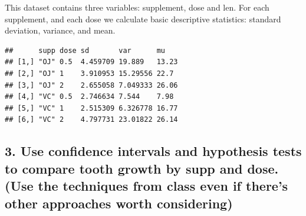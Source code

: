 \documentclass[]{article}
\newenvironment{Shaded}{\begin{snugshade}}{\end{snugshade}}
\newcommand{\CommentTok}[1]{\textcolor[rgb]{0.56,0.35,0.01}{\textit{#1}}}
\newcommand{\ControlFlowTok}[1]{\textcolor[rgb]{0.13,0.29,0.53}{\textbf{#1}}}
\newcommand{\DataTypeTok}[1]{\textcolor[rgb]{0.13,0.29,0.53}{#1}}
\newcommand{\KeywordTok}[1]{\textcolor[rgb]{0.13,0.29,0.53}{\textbf{#1}}}
\newcommand{\NormalTok}[1]{#1}
\newcommand{\OperatorTok}[1]{\textcolor[rgb]{0.81,0.36,0.00}{\textbf{#1}}}
\newcommand{\StringTok}[1]{\textcolor[rgb]{0.31,0.60,0.02}{#1}}
\begin{document}
This dataset contains three variables: supplement, dose and len. For
each supplement, and each dose we calculate basic descriptive
statistics: standard deviation, variance, and mean.

\begin{Shaded}
\end{Shaded}

\begin{verbatim}
##      supp dose sd       var      mu   
## [1,] "OJ" 0.5  4.459709 19.889   13.23
## [2,] "OJ" 1    3.910953 15.29556 22.7 
## [3,] "OJ" 2    2.655058 7.049333 26.06
## [4,] "VC" 0.5  2.746634 7.544    7.98 
## [5,] "VC" 1    2.515309 6.326778 16.77
## [6,] "VC" 2    4.797731 23.01822 26.14
\end{verbatim}

\hypertarget{use-confidence-intervals-and-hypothesis-tests-to-compare-tooth-growth-by-supp-and-dose.-use-the-techniques-from-class-even-if-theres-other-approaches-worth-considering}{%
\subsection{3. Use confidence intervals and hypothesis tests to compare
tooth growth by supp and dose. (Use the techniques from class even if
there's other approaches worth
considering)}\label{use-confidence-intervals-and-hypothesis-tests-to-compare-tooth-growth-by-supp-and-dose.-use-the-techniques-from-class-even-if-theres-other-approaches-worth-considering}}
\end{document}
